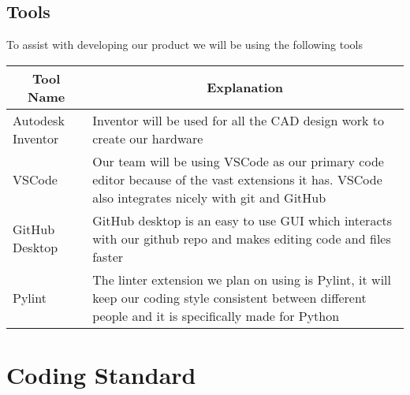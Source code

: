 \documentclass{article}
\begin{document}
\subsection{Tools}
To assist with developing our product we will be using the following tools

\begin{table}[!hbt]
	\centering
	\begin{tabular}{|p{4cm}|p{8cm}|}
	\hline
	\multicolumn{1}{|c|}{\textbf{Tool Name}} & \multicolumn{1}{c|}{\textbf{Explanation}} 
	\\ \hline
	Autodesk Inventor
	&  Inventor will be used for all the CAD design work to create our hardware  
	\newline                              
	\\ \hline
	VSCode
	&  Our team will be using VSCode as our primary code editor because of the vast extensions it has. VSCode also integrates nicely with git and GitHub
	\newline                              
	\\ \hline
	GitHub Desktop
	&  GitHub desktop is an easy to use GUI which interacts with our github repo and makes editing code and files faster
	\newline                              
	\\ \hline
	Pylint
	&  The linter extension we plan on using is Pylint, it will keep our coding style consistent between different people and it is specifically made for Python
	\newline                              
	\\ \hline
	\end{tabular}
\end{table}




\section{Coding Standard}
\end{document}
